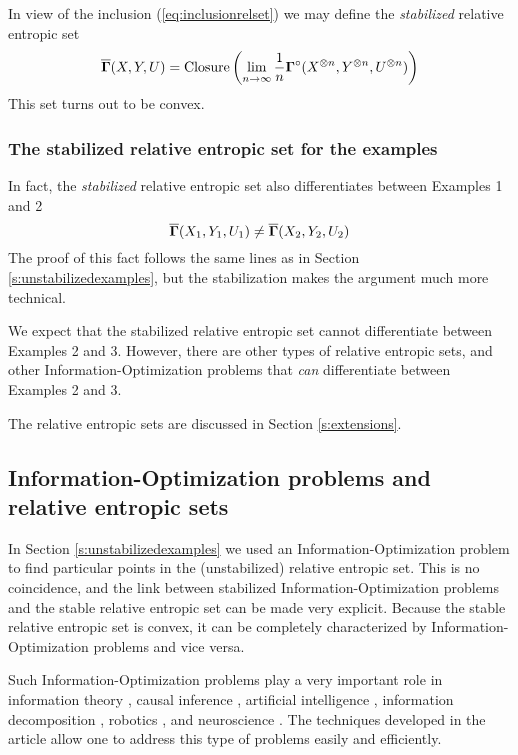   In view of the inclusion (\ref{eq:inclusionrelset}) we may define the
  \emph{stabilized} relative entropic set
  \[
  \overline{\bm\Gamma}(X, Y, U) 
  =
  \operatorname{\mathrm{Closure}}\left( \lim_{n \stackrel{}{\rightarrow} \infty}
  \frac{1}{n}\bm\Gamma^{\circ}(X^{\otimes n}, Y^{\otimes n}, U^{\otimes
    n})\right)
  \]
This set turns out to be convex. 

\subsubsection{The stabilized relative entropic set for the examples}

  In fact, the \emph{stabilized} relative entropic set also
  differentiates between Examples 1 and 2
  \[
    \overline{\bm\Gamma}(X_{1},Y_{1},U_{1})\neq\overline{\bm\Gamma}(X_{2},Y_{2},U_{2})
  \]
  The proof of this fact follows the same lines as in Section
  \ref{s:unstabilizedexamples}, but the stabilization makes the argument
  much more technical.


We expect that the stabilized relative entropic set cannot
differentiate between Examples 2 and 3. However, there are other types of relative
entropic sets, and other Information-Optimization problems that
\emph{can} differentiate between Examples 2 and 3.

The relative entropic sets are discussed in Section \ref{s:extensions}.

\subsection{Information-Optimization problems and relative entropic sets}

In Section \ref{s:unstabilizedexamples} we used an
Information-Optimization problem to find particular points in the
(unstabilized) relative entropic set.  This is no coincidence, and the
link between stabilized Information-Optimization problems and the
stable relative entropic set can be made very explicit.  Because the
stable relative entropic set is convex, it can be completely
characterized by Information-Optimization problems and vice versa.

Such Information-Optimization problems play a very important role in information theory \cite{Yeung-First-2012}, causal inference \cite{Steudel-Information-2015}, artificial intelligence
\cite{Dijk-Informational-2013}, information decomposition \cite{Bertschinger-Quantifying-2014}, robotics \cite{Ay-Predictive-2008},
and neuroscience \cite{Friston-Free-2009}.
The techniques developed in the article allow one to address this type of problems easily and efficiently.

